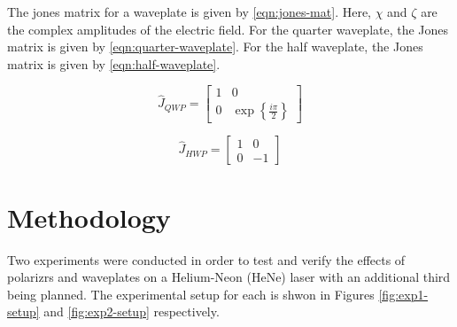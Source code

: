 \documentclass[aip, cp, amsmath, amssymb, reprint]{revtex4-2}
\begin{document}
        The jones matrix for a waveplate is given by \eqref{eqn:jones-mat}. Here, $\chi$ and $\zeta$ are the complex amplitudes of the electric field. For the quarter waveplate, the Jones matrix is given by \eqref{eqn:quarter-waveplate}. For the half waveplate, the Jones matrix is given by \eqref{eqn:half-waveplate}.
        \begin{minipage}{\linewidth}
        \centering
        \begin{minipage}{0.55\linewidth}
            \begin{equation} \label{eqn:quarter-waveplate}
                \hat{J}_{QWP} = \begin{bmatrix} 1 & 0 \\ 0 & \exp\left\{\frac{i\pi}{2}\right\}\end{bmatrix}
            \end{equation}
        \end{minipage}
        \begin{minipage}{0.44\linewidth}
            \begin{equation} \label{eqn:half-waveplate}
                \hat{J}_{HWP} = \begin{bmatrix} 1 & 0 \\ 0 & -1\end{bmatrix}
            \end{equation}
        \end{minipage}
        \end{minipage}


    \section{Methodology}
        Two experiments were conducted in order to test and verify the effects of polarizrs and waveplates on a Helium-Neon (HeNe) laser with an additional third being planned. The experimental setup for each is shwon in Figures \ref{fig:exp1-setup} and \ref{fig:exp2-setup} respectively. 
        
\end{document}
